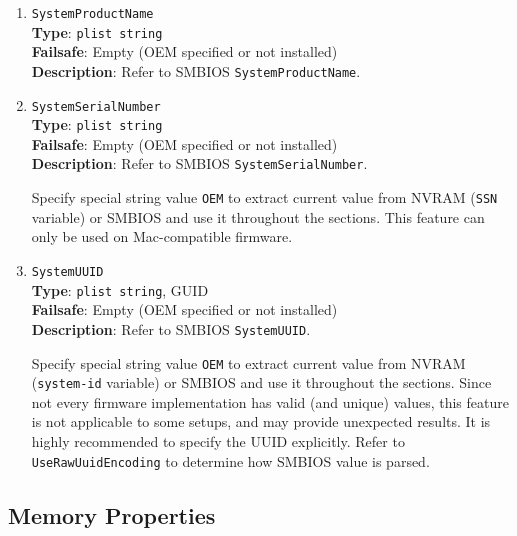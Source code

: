 \documentclass[]{article}
\begin{document}
\begin{enumerate}
  \emph{Note}: On certain Mac models, such as the \texttt{MacBookPro10,x} and any \texttt{MacBookAir},
  SPMemoryReporter.spreporter will ignore \texttt{PT\_FEATURE\_HAS\_SOLDERED\_SYSTEM\_MEMORY}
  and assume that system memory is non-upgradable.

\item
  \texttt{SystemProductName}\\
  \textbf{Type}: \texttt{plist\ string}\\
  \textbf{Failsafe}: Empty (OEM specified or not installed)\\
  \textbf{Description}: Refer to SMBIOS \texttt{SystemProductName}.
\item
  \texttt{SystemSerialNumber}\\
  \textbf{Type}: \texttt{plist\ string}\\
  \textbf{Failsafe}: Empty (OEM specified or not installed)\\
  \textbf{Description}: Refer to SMBIOS \texttt{SystemSerialNumber}.

  Specify special string value \texttt{OEM} to extract current value from NVRAM
  (\texttt{SSN} variable) or SMBIOS and use it throughout the sections.
  This feature can only be used on Mac-compatible firmware.
\item
  \texttt{SystemUUID}\\
  \textbf{Type}: \texttt{plist\ string}, GUID\\
  \textbf{Failsafe}: Empty (OEM specified or not installed)\\
  \textbf{Description}: Refer to SMBIOS \texttt{SystemUUID}.

  Specify special string value \texttt{OEM} to extract current value from NVRAM
  (\texttt{system-id} variable) or SMBIOS and use it throughout the sections.
  Since not every firmware implementation has valid (and unique) values, this
  feature is not applicable to some setups, and may provide unexpected results.
  It is highly recommended to specify the UUID explicitly. Refer to
  \texttt{UseRawUuidEncoding} to determine how SMBIOS value is parsed.
\end{enumerate}

\subsection{Memory Properties}\label{platforminfomemory}
\end{document}
